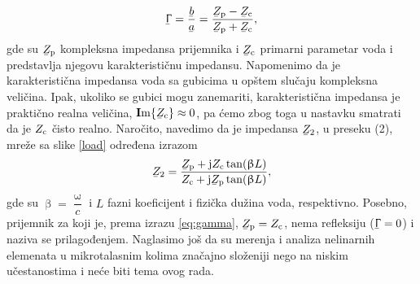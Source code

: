 \documentclass[a4paper, 12pt, diplomski]{etf}
\newcommand{\faz}[1]{\underaccent{\bar}{#1}}
\begin{document}
\begin{equation}
    \faz \Upgamma = \frac {\faz b}{\faz a} 
    = \frac{ \faz Z_{\rm p} - \faz Z_{\rm c}  }
    {\faz Z_{\rm p} + \faz Z_{\rm c}}, \label{eq:gamma}
\end{equation}
gde su $\faz Z_{\rm p}$ kompleksna impedansa prijemnika
i $\faz Z_{\rm c}$ primarni parametar voda i predstavlja 
njegovu karakterističnu impedansu. Napomenimo da je karakteristična impedansa voda sa gubicima u opštem slučaju kompleksna veličina.
Ipak, ukoliko se gubici mogu zanemariti, karakteristična impedansa je praktično
realna veličina, ${\bf I}{\rm m}\{
\faz Z_{\rm c}\} 
\approx 0$, pa ćemo zbog toga u nastavku smatrati da je $Z_{\rm c}$ čisto realno.
Naročito, navedimo da je impedansa $\faz Z_{\rm 2}$, u preseku (2), mreže sa slike 
\ref{load} određena izrazom
\begin{equation}
    \faz Z_{\rm 2} = \frac
    { \faz Z_{\rm p} + {\rm j} Z_{\rm c} \tan(\upbeta L) }  
    {  Z_{\rm c} + {\rm j}\faz Z_{\rm p} \tan(\upbeta L) },
    \label{eq:zin}
\end{equation}
gde su $\upbeta = \dfrac{\upomega}{c}$ 
i $L$
fazni koeficijent i fizička dužina voda, respektivno.
%
Posebno, prijemnik za koji je, prema izrazu
\eqref{eq:gamma},  $\faz Z_{\rm p} = Z_{\rm c}$,
nema refleksiju ($\faz \Upgamma = 0$) 
 i naziva se prilagođenjem. 
Naglasimo još da su merenja i analiza nelinarnih 
elemenata u mikrotalasnim kolima značajno složeniji
nego na niskim učestanostima i neće biti 
tema ovog rada.
\end{document}
